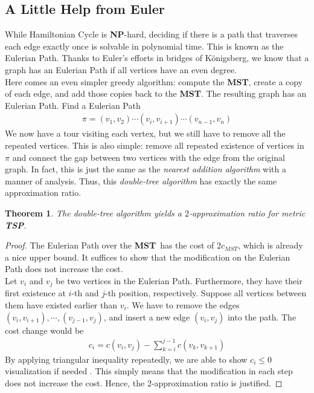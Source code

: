 \documentclass[11pt,psfig,times]{article}
\newcommand*{\NP}{\textbf{NP}}
\newcommand*{\mst}{\textbf{MST}}
\newtheorem{theorem}{Theorem}
\begin{document}
\subsection{A Little Help from Euler}
While Hamiltonian Cycle is \NP-hard, deciding if there is a path that traverses each edge exactly once 
is solvable in polynomial time. This is known as the Eulerian Path. Thanks to Euler's efforts 
in bridges of K\"onigsberg, we know that a graph has an Eulerian Path if all vertices have an even degree. \\
Here comes an even simpler greedy algorithm: compute the \mst, create a copy of each 
edge, and add those copies back to the \mst. The resulting graph has an Eulerian Path. Find a Eulerian Path 
\begin{align*}
    \pi = (v_1, v_2)\cdots(v_i, v_{i+1})\cdots(v_{n-1}, v_n)    
\end{align*}
We now have a tour visiting each vertex, but we still have 
to remove all the repeated vertices. This is also simple: remove all repeated existence of vertices in $\pi$ 
and connect the gap between two vertices with the edge from the original graph. In fact, this is just the same as 
the \textit{nearest addition algorithm} with a manner of analysis. Thus, this \textit{double-tree algorithm}
has exactly the same approximation ratio. 
\begin{theorem}
    The \textit{double-tree algorithm} yields a $2$-approximation ratio for metric \textbf{TSP}. 
    \label{theorem:double-tree}   
\end{theorem}
\begin{proof}
    The Eulerian Path over the \mst\ has the cost of $2c_{MST}$, which is already a nice upper bound. 
    It suffices to show that the modification on the Eulerian Path does not increase the cost. \\
    Let $v_i$ and $v_j$ be two vertices in the Eulerian Path. Furthermore, they have their first existence at $i$-th and $j$-th position, respectively.
    Suppose all vertices between them have existed earlier than $v_i$. We have to remove the edges $(v_i, v_{i+1}), \cdots, (v_{j-1}, v_j)$, 
    and insert a new edge $(v_i, v_j)$ into the path. The cost change would be 
    \begin{align*}
        c_i = c(v_i, v_j) - \sum_{k = i}^{j-1} c(v_k, v_{k+1})
    \end{align*}
    By applying triangular inequality repeatedly, we are able to show $c_i \leq 0$ \color{red} visualization if needed \color{black}. 
    This simply means that the modification in each step does not increase the cost. Hence, the 2-approximation ratio is justified.
\end{proof}
\end{document}
